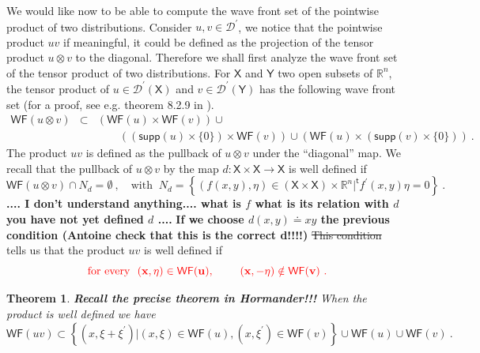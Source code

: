 \documentclass[11pt]{book}
\newcommand{\com}[1]{{\color{red}\bf #1}}
\newcommand{\sbar}[1]{\sout{\color{red} #1}}
\newcommand{\supp}{\mathsf{supp}}
\newcommand{\WF}{\mathsf{WF}}
\newcommand{\Dcal}{\mathcal{D}}
\newcommand{\Rbb}{\mathbb{R}}
\newcommand{\Xsf}{\mathsf{X}}
\newcommand{\Ysf}{\mathsf{Y}}
\newcommand{\tsf}{\mathsf{t}}
\theoremstyle{break}
\newtheorem{theorem}{Theorem}[chapter]
\begin{document}
We would like now to be able to compute the wave front set of the pointwise product of two distributions. Consider $u,v\in \Dcal^\prime$, we notice that the pointwise product $uv$
if meaningful, it could be defined as the projection of the tensor product $u \otimes v$ to the diagonal. Therefore we shall first analyze the wave front set of the tensor product of two distributions. For $\Xsf$ and $\Ysf$ two open subsets of $\Rbb^n$, the tensor product of $u\in\Dcal^\prime(\Xsf)$ and $v\in\Dcal^\prime(\Ysf)$ has the following wave front set (for a proof, see e.g. theorem 8.2.9 in \cite{hormander_analysis_1990}).
%
\begin{eqnarray*}
\WF(u \otimes v) &\subset& \left( \WF(u) \times \WF(v) \right) \cup \\
&& \qquad \left( \left( \supp(u) \times \{0\} \right) \times \WF(v) \right) \cup \left( \WF(u) \times \left( \supp(v) \times \{0\} \right) \right) \ . 
\end{eqnarray*}
%
The product $uv$ is defined as the pullback of $u \otimes v$ under the ``diagonal'' map. We recall that the pullback of $u\otimes v$ by the map $d : \Xsf \times \Xsf \to \Xsf$ is well defined if 
%
\begin{equation*}
\WF(u \otimes v) \cap N_d = \emptyset \ , \quad \mbox{with } \ N_d = \left\{ (f(x,y) , \eta) \in ( \Xsf \times \Xsf )\times \Rbb^n | ^{\tsf}f^\prime(x,y) \eta = 0 \right\} \ .
\end{equation*}
\com{.... I don't understand anything.... what is $f$ what is its relation with $d$ you have not yet defined $d$ ....  }
%
\com{If we choose $d(x,y) \doteq xy$ the previous condition (Antoine check that this is the correct d!!!!)}
\sbar{This condition} tells us that the product $uv$ is well defined if 
%
\begin{equation*}
\com{\mbox{ for every } \ (x,\eta) \in \WF(u), \qquad \ (x,-\eta) \notin \WF(v) \ . }
\end{equation*}


\begin{theorem}
\com{Recall the precise theorem in Hormander!!!}
When the product is well defined we have 
%
\begin{equation*}
\WF(u v) \subset \left\{ (x,\xi+\xi^\prime) | (x,\xi) \in \WF(u) , (x,\xi^\prime) \in \WF(v) \right\} \cup \WF(u) \cup \WF(v) \ . 
\end{equation*} 
\end{theorem}
\end{document}
